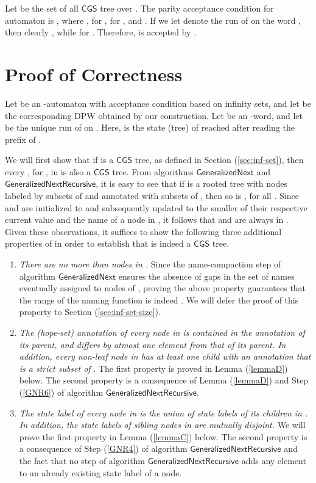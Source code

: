 \documentclass[3p]{elsarticle}
\newcommand{\CGS}{\ensuremath{\textsf{CGS }}}
\newcommand{\algo}[1]{\ensuremath{\textsf{{#1}}}}
\begin{document}
Let  be the set of all \CGS tree over .  The parity acceptance
condition for automaton  is , where ,
 for ,
 for , and
.  If we let  denote the run
of  on the word , then clearly , while  for
.  Therefore,  is accepted by .



\section{Proof of Correctness}

Let  be an -automaton
with acceptance condition based on infinity sets, and let  be the
corresponding DPW obtained by our construction.  Let  be an -word, and let  be the unique run of  on .  Here,  is the state (tree)
of  reached after reading the prefix  of
.

We will first show that if  is a \CGS tree, as defined in Section
(\ref{sec:inf-set}), then every , for , in  is
also a \CGS tree.  From algorithms \algo{GeneralizedNext} and
\algo{GeneralizedNextRecursive}, it is easy to see that if  is a
rooted tree with nodes labeled by subsets of  and annotated with
subsets of , then so is , for all .  Since
 and  are initialized to  and
subsequently updated to the smaller of their respective current value
and the name of a node in , it follows that  and
 are always in .  Given these observations, it
suffices to show the following three additional properties of
 in order to establish that  is indeed a \CGS tree.
\begin{enumerate}
\item \emph{There are no more than  nodes in
  .}  Since the name-compaction step of algorithm
  \algo{GeneralizedNext} ensures the absence of gaps in the set of
  names eventually assigned to nodes of , proving the above
  property guarantees that the range of the naming function 
  is indeed .  We will defer the proof of this
  property to Section (\ref{sec:inf-set-size}).
\item \emph{The (hope-set) annotation of every node in  is
  contained in the annotation of its parent, and differs by atmost one
  element from that of its parent.  In addition, every non-leaf node
   in  has at least one child with an annotation that is a
  strict subset of }.  The first property is proved in Lemma
  (\ref{lemmaD}) below.  The second property is a consequence of Lemma
  (\ref{lemmaD}) and Step (\ref{GNR6}) of algorithm
  \algo{GeneralizedNextRecursive}.
\item \emph{The state label of every node in  is the union of
  state labels of its children in .  In addition, the state
  labels of sibling nodes in  are mutually disjoint.}  We will
  prove the first property in Lemma (\ref{lemmaC}) below.  The second
  property is a consequence of Step (\ref{GNR4}) of algorithm
  \algo{GeneralizedNextRecursive} and the fact that no step of
  algorithm \algo{GeneralizedNextRecursive} adds any element to an
  already existing state label of a node.
\end{enumerate}
\end{document}
